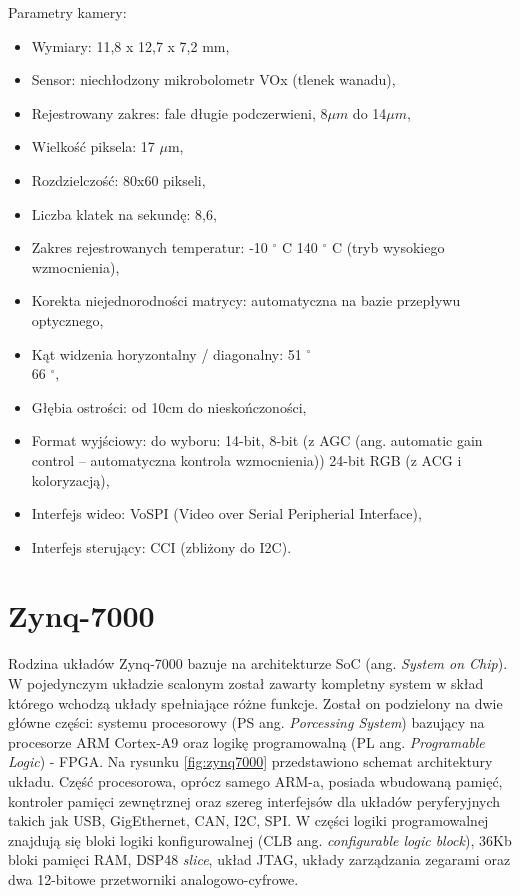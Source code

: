 Parametry kamery:
\begin{itemize}
\item Wymiary: 11,8 x 12,7 x 7,2 mm, 
\item Sensor: niechłodzony mikrobolometr VOx (tlenek wanadu),
\item Rejestrowany zakres: fale długie podczerwieni, 8$\mu m$ do 14$\mu m$,
\item Wielkość piksela: 17 $\mu$m,
\item Rozdzielczość: 80x60 pikseli,
\item Liczba klatek na sekundę: 8,6,  %
\item Zakres rejestrowanych temperatur: -10  $^\circ$  C 140  $^\circ$  C (tryb wysokiego wzmocnienia),
\item Korekta niejednorodności matrycy: automatyczna na bazie przepływu optycznego, %
\item Kąt widzenia horyzontalny / diagonalny: 51 $^\circ$ \\ 66 $^\circ$,
\item Głębia ostrości: od 10cm do nieskończoności,
\item Format wyjściowy: do wyboru: 14-bit, 8-bit (z AGC (ang. automatic gain control -- automatyczna kontrola wzmocnienia)) 24-bit RGB (z ACG i koloryzacją),
\item Interfejs wideo: VoSPI (Video over Serial Peripherial Interface),
\item Interfejs sterujący: CCI (zbliżony do I2C).
\end{itemize}


\section{Zynq-7000}

Rodzina układów Zynq-7000 bazuje na architekturze SoC (ang. \textit{System on Chip}). W pojedynczym układzie scalonym został zawarty kompletny system w skład którego wchodzą układy spełniające różne funkcje. Został on podzielony na dwie główne części: systemu procesorowy (PS ang. \textit{Porcessing System}) bazujący na procesorze ARM Cortex-A9 oraz logikę programowalną (PL ang. \textit{Programable Logic}) - FPGA. %
Na rysunku \ref{fig:zynq7000} przedstawiono schemat architektury układu. %
Część procesorowa, oprócz samego ARM-a, posiada wbudowaną pamięć, kontroler pamięci zewnętrznej oraz szereg interfejsów dla układów peryferyjnych takich jak USB, GigEthernet, CAN, I2C, SPI. %
W części logiki programowalnej znajdują się bloki logiki konfigurowalnej (CLB ang. \textit{configurable logic block}), 36Kb bloki pamięci RAM, DSP48 \textit{slice}, układ JTAG, układy zarządzania zegarami oraz dwa 12-bitowe przetworniki analogowo-cyfrowe.

